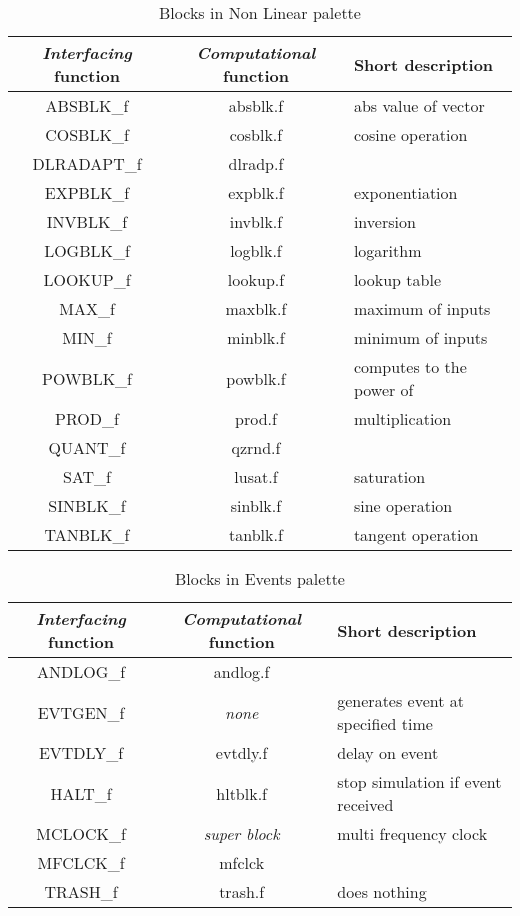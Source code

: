 \documentclass{book}
\newcommand{\computational}{{\em Computational }}
\newcommand{\interfacing}{{\em Interfacing }}
\begin{document}
\begin{table}[ht]
\begin{center}
\begin{tabular}{|c|c|l|}\hline
\interfacing function&\computational function&Short description\\
\hline
ABSBLK\_f&absblk.f&abs value of vector \\
COSBLK\_f& cosblk.f          &   cosine operation         \\
DLRADAPT\_f& dlradp.f          &            \\
EXPBLK\_f& expblk.f          &   exponentiation         \\
INVBLK\_f&  invblk.f         &     inversion       \\
LOGBLK\_f& logblk.f          &     logarithm       \\
LOOKUP\_f&  lookup.f         &   lookup table         \\
MAX\_f&  maxblk.f         &      maximum of inputs      \\
MIN\_f&  minblk.f         &     minimum of inputs       \\
POWBLK\_f& powblk.f           &   computes to the power of         \\
PROD\_f&  prod.f         &      multiplication      \\
QUANT\_f& qzrnd.f          &            \\
SAT\_f&   lusat.f        &   saturation         \\
SINBLK\_f& sinblk.f          &      sine operation      \\
TANBLK\_f& tanblk.f          &    tangent operation        \\ \hline   
\end{tabular}
\end{center}
\caption{Blocks in Non Linear palette}
\end{table}

\begin{table}[ht]
\begin{center}
\begin{tabular}{|c|c|l|}\hline
\interfacing function&\computational function&Short description\\
\hline
ANDLOG\_f& andlog.f          &            \\
EVTGEN\_f& {\em none}          &   generates event at specified time         \\
EVTDLY\_f& evtdly.f          &     delay on event       \\
HALT\_f&  hltblk.f         &   stop simulation if event received         \\
MCLOCK\_f& {\em super block}          &   multi frequency clock         \\
MFCLCK\_f&  mfclck         &            \\
TRASH\_f& trash.f          &   does nothing         \\ \hline   
\end{tabular}
\end{center}
\caption{Blocks in Events palette}
\end{table}
\end{document}
